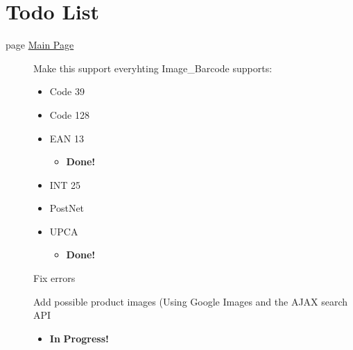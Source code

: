 \hypertarget{todo}{}\section{Todo List}\label{todo}
\label{todo__todo000001}
\hypertarget{todo__todo000001}{}
 \begin{description}
\item[page \hyperlink{index}{Main Page} ]Make this support everyhting Image\_\-Barcode supports:\begin{itemize}
\item Code 39\item Code 128\item EAN 13\begin{itemize}
\item {\bf Done!} \end{itemize}
\item INT 25\item PostNet\item UPCA\begin{itemize}
\item {\bf Done!} \end{itemize}
\end{itemize}


Fix errors 

Add possible product images (Using Google Images and the AJAX search API\begin{itemize}
\item {\bf In} {\bf Progress!} \end{itemize}


\end{description}
